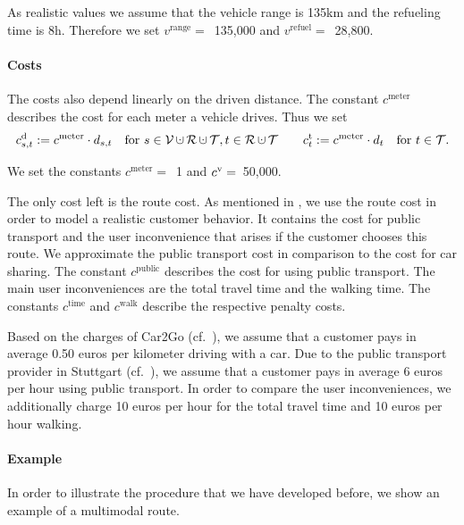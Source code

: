 As realistic values we assume that the vehicle range is 135km and the refueling time is 8h. Therefore we set ${v^{\operatorname{range}} =}$~135,000 and ${v^{\operatorname{refuel}} =}$~28,800.

\paragraph{Costs} \parfill

The costs also depend linearly on the driven distance. The constant $c^{\operatorname{meter}}$ describes the cost for each meter a vehicle drives. Thus we set
\begin{align*}
	\cd_{s,t} := c^{\operatorname{meter}}\cdot d_{s,t} && \text{for } s\in\mathcal{V}\cupdot\mathcal{R}\cupdot\mathcal{T}, t\in\mathcal{R}\cupdot\mathcal{T} && && \ct_t := c^{\operatorname{meter}}\cdot d_t && \text{for } t\in\mathcal{T}.
\end{align*}

We set the constants ${c^{\operatorname{meter}} =}$~1 and ${c^{\operatorname{v}} =}$~50,000.

The only cost left is the route cost. As mentioned in , we use the route cost in order to model a realistic customer behavior. It contains the cost for public transport and the user inconvenience that arises if the customer chooses this route. We approximate the public transport cost in comparison to the cost for car sharing. The constant $c^{\operatorname{public}}$ describes the cost for using public transport. The main user inconveniences are the total travel time and the walking time. The constants $c^{\operatorname{time}}$ and $c^{\operatorname{walk}}$ describe the respective penalty costs.

Based on the charges of Car2Go (cf.~\cite{Car2Go}), we assume that a customer pays in average 0.50 euros per kilometer driving with a car. Due to the public transport provider in Stuttgart (cf.~\cite{VVS}), we assume that a customer pays in average 6 euros per hour using public transport. In order to compare the user inconveniences, we additionally charge 10 euros per hour for the total travel time and 10 euros per hour walking.

\newpage

\paragraph{Example} \parfill

In order to illustrate the procedure that we have developed before, we show an example of a multimodal route.

